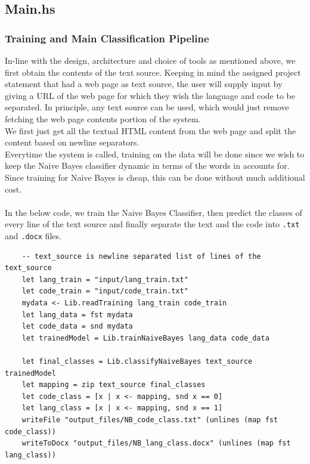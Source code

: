 \documentclass[12pt]{scrreprt}
\newcommand{\ttt}[1]{\texttt{#1}}
\begin{document}
\subsection{Main.hs}

\subsubsection{Training and Main Classification Pipeline}

In-line with the design, architecture and choice of tools as mentioned above, we first obtain the contents of the text source. Keeping in mind the assigned project statement that had a web page as text source, the user will supply input by giving a URL of the web page for which they wish the language and code to be separated. In principle, any text source can be used, which would just remove fetching the web page contents portion of the system. \\ 
We first just get all the textual HTML content from the web page and split the content based on newline separators. \\ Everytime the system is called, training on the data will be done since we wish to keep the Naive Bayes classifier dynamic in terms of the words in accounts for. Since training for Naive Bayes is cheap, this can be done without much additional cost.\\
\\ In the below code, we train the Naive Bayes Classifier, then predict the classes of every line of the text source and finally separate the text and the code into \ttt{.txt} and \ttt{.docx} files.

\begin{verbatim}
    -- text_source is newline separated list of lines of the text_source
    let lang_train = "input/lang_train.txt"
    let code_train = "input/code_train.txt"
    mydata <- Lib.readTraining lang_train code_train
    let lang_data = fst mydata
    let code_data = snd mydata
    let trainedModel = Lib.trainNaiveBayes lang_data code_data

    let final_classes = Lib.classifyNaiveBayes text_source trainedModel
    let mapping = zip text_source final_classes
    let code_class = [x | x <- mapping, snd x == 0]
    let lang_class = [x | x <- mapping, snd x == 1]
    writeFile "output_files/NB_code_class.txt" (unlines (map fst code_class))
    writeToDocx "output_files/NB_lang_class.docx" (unlines (map fst lang_class))
   \end{verbatim}
   
\end{document}
